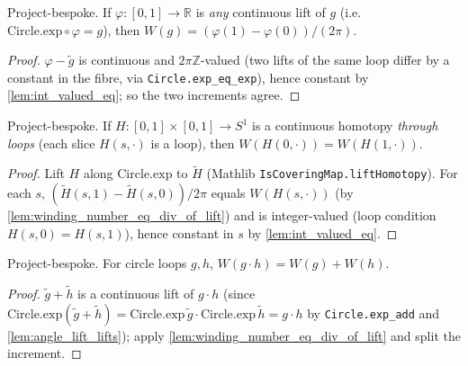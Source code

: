 \begin{lemma}

  \label{lem:winding_number_eq_div_of_lift}
  Project-bespoke. If $\varphi : [0,1] \to \mathbb{R}$ is \emph{any} continuous
  lift of $g$ (i.e.\ $\mathrm{Circle.exp}\circ\varphi = g$), then $W(g) =
  (\varphi(1) - \varphi(0))/(2\pi)$.
\end{lemma}
\begin{proof}
  \leanok
  $\varphi - \widetilde g$ is continuous and $2\pi\mathbb{Z}$-valued (two lifts of
  the same loop differ by a constant in the fibre, via \texttt{Circle.exp\_eq\_exp}),
  hence constant by \cref{lem:int_valued_eq}; so the two increments agree.
\end{proof}

\begin{lemma}

  \label{lem:winding_number_eq_of_homotopy}
  Project-bespoke. If $H : [0,1]\times[0,1] \to S^1$ is a continuous homotopy
  \emph{through loops} (each slice $H(s,\cdot)$ is a loop), then $W(H(0,\cdot)) =
  W(H(1,\cdot))$.
\end{lemma}
\begin{proof}
  \leanok
  Lift $H$ along $\mathrm{Circle.exp}$ to $\widetilde H$ (Mathlib
  \texttt{IsCoveringMap.liftHomotopy}). For each $s$, $(\widetilde H(s,1) -
  \widetilde H(s,0))/2\pi$ equals $W(H(s,\cdot))$ (by
  \cref{lem:winding_number_eq_div_of_lift}) and is integer-valued (loop condition
  $H(s,0)=H(s,1)$), hence constant in $s$ by \cref{lem:int_valued_eq}.
\end{proof}

\begin{lemma}

  \label{lem:winding_number_mul}
  Project-bespoke. For circle loops $g, h$, $W(g\cdot h) = W(g) + W(h)$.
\end{lemma}
\begin{proof}

\leanok
  $\widetilde g + \widetilde h$ is a continuous lift of $g\cdot h$ (since
  $\mathrm{Circle.exp}(\widetilde g + \widetilde h) = \mathrm{Circle.exp}\,
  \widetilde g \cdot \mathrm{Circle.exp}\,\widetilde h = g\cdot h$ by
  \texttt{Circle.exp\_add} and \cref{lem:angle_lift_lifts}); apply
  \cref{lem:winding_number_eq_div_of_lift} and split the increment.
\end{proof}

